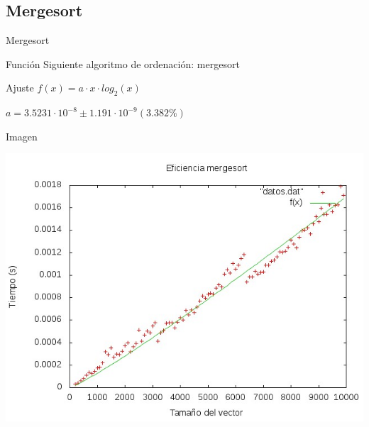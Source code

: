 \documentclass[compress]{beamer}
\begin{document}
\subsection{Mergesort}
\begin{frame}{Mergesort}
	\begin{block}{Función}
	Siguiente algoritmo de ordenación: mergesort
	\end{block}
	
	\begin{block}{Ajuste}
	$ f(x) = a\cdot x\cdot log_2(x)$
	
	$ a               = 3.5231\cdot 10^{-8}       \pm 1.191\cdot 10^{-9}    (3.382\%) $
	\end{block}
\end{frame}
\begin{frame}
	\begin{alertblock}{Imagen}
	\begin{center}
	\includegraphics[scale=0.55]{../Graficas/Mergesort/mergesortO0_bruno.jpeg}
	\end{center}
	\end{alertblock}
\end{frame}

\end{document}

